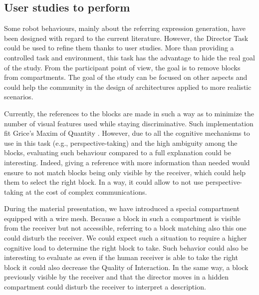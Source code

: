 \subsection{User studies to perform}

Some robot behaviours, mainly about the referring expression generation, have been designed with regard to the current literature. However, the Director Task could be used to refine them thanks to user studies. More than providing a controlled task and environment, this task has the advantage to hide the real goal of the study. From the participant point of view, the goal is to remove blocks from compartments. The goal of the study can be focused on other aspects and could help the community in the design of architectures applied to more realistic scenarios.

Currently, the references to the blocks are made in such a way as to minimize the number of visual features used while staying discriminative. Such implementation fit Grice's Maxim of Quantity \cite{grice_1975_logic}. However, due to all the cognitive mechanisms to use in this task (e.g., perspective-taking) and the high ambiguity among the blocks, evaluating such behaviour compared to a full explanation could be interesting. Indeed, giving a reference with more information than needed would ensure to not match blocks being only visible by the receiver, which could help them to select the right block. In a way, it could allow to not use perspective-taking at the cost of complex communications.

During the material presentation, we have introduced a special compartment equipped with a wire mesh. Because a block in such a compartment is visible from the receiver but not accessible, referring to a block matching also this one could disturb the receiver. We could expect such a situation to require a higher cognitive load to determine the right block to take. Such behavior could also be interesting to evaluate as even if the human receiver is able to take the right block it could also decrease the Quality of Interaction. In the same way, a block previously visible by the receiver and that the director moves in a hidden compartment could disturb the receiver to interpret a description.
